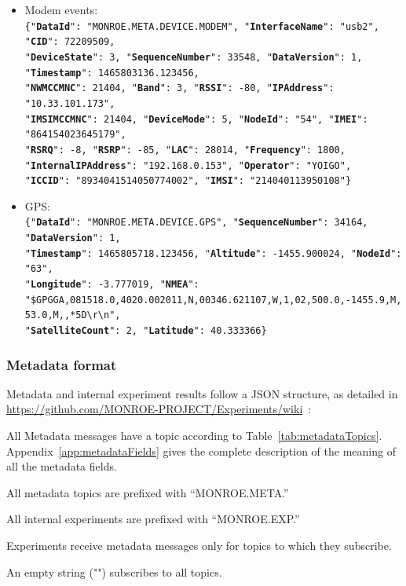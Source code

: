 \documentclass[a4paper,10pt]{article}
\begin{document}
\begin{itemize}
	\item Modem events:\\
	\texttt{\footnotesize\{"\textbf{DataId}": "MONROE.META.DEVICE.MODEM", "\textbf{InterfaceName}": "usb2", "\textbf{CID}": 72209509,\\
		"\textbf{DeviceState}": 3, "\textbf{SequenceNumber}": 33548, "\textbf{DataVersion}": 1, \\
		"\textbf{Timestamp}": 1465803136.123456, \\
		"\textbf{NWMCCMNC}": 21404, "\textbf{Band}": 3, "\textbf{RSSI}": -80, "\textbf{IPAddress}": "10.33.101.173", \\
		"\textbf{IMSIMCCMNC}": 21404, "\textbf{DeviceMode}": 5, "\textbf{NodeId}": "54", "\textbf{IMEI}": "864154023645179", \\
		"\textbf{RSRQ}": -8, "\textbf{RSRP}": -85, "\textbf{LAC}": 28014, "\textbf{Frequency}": 1800, \\
		"\textbf{InternalIPAddress}": "192.168.0.153", "\textbf{Operator}": "YOIGO", \\
		"\textbf{ICCID}": "8934041514050774002", "\textbf{IMSI}": "214040113950108"\}}
	
	\item GPS:\\
	\texttt{\footnotesize\{"\textbf{DataId}": "MONROE.META.DEVICE.GPS", "\textbf{SequenceNumber}": 34164, "\textbf{DataVersion}": 1, \\
		"\textbf{Timestamp}": 1465805718.123456, "\textbf{Altitude}": -1455.900024, "\textbf{NodeId}": "63", \\
		"\textbf{Longitude}": -3.777019, "\textbf{NMEA}":\\ "\$GPGGA,081518.0,4020.002011,N,00346.621107,W,1,02,500.0,-1455.9,M,53.0,M,,*5D\textbackslash{}r\textbackslash{}n",\\
		"\textbf{SatelliteCount}": 2, "\textbf{Latitude}": 40.333366\}}
	
\end{itemize}

\subsubsection{Metadata format}
Metadata and internal experiment results follow a JSON structure, as detailed in \url{https://github.com/MONROE-PROJECT/Experiments/wiki}~:
\begin{itemize*}
	\item All Metadata messages have a topic according to Table~\ref{tab:metadataTopics}. Appendix~\ref{app:metadataFields} gives the complete description of the meaning of all the metadata fields.
	\item All metadata topics are prefixed with ``MONROE.META.''
	\item All internal experiments are prefixed with ``MONROE.EXP.''
	\item Experiments receive metadata messages only for topics to which they subscribe.
	\item An empty string ("") subscribes to all topics.
\end{itemize*}
\end{document}
